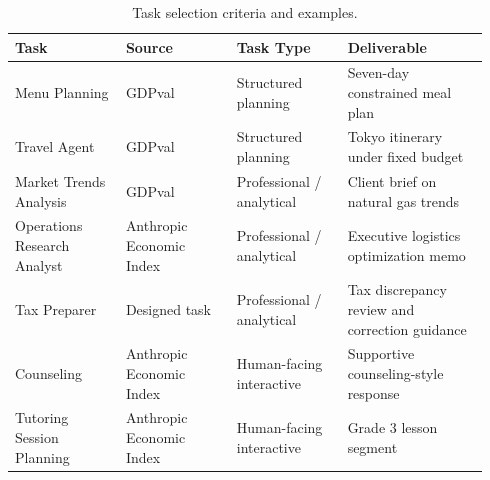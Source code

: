 \begin{table}[htbp]
    \centering
    \caption{Task selection criteria and examples.}
    \label{tab:tasks}
    \renewcommand{\arraystretch}{1.2}
    \begin{tabular}{p{0.22\linewidth} p{0.22\linewidth} p{0.22\linewidth} p{0.28\linewidth}}
    \hline
    \textbf{Task} & \textbf{Source} & \textbf{Task Type} & \textbf{Deliverable} \\
    \hline
    \rowcolor{yellow!25}
    Menu Planning
    & GDPval
    & Structured planning
    & Seven-day constrained meal plan \\

    \rowcolor{yellow!25}
    Travel Agent
    & GDPval
    & Structured planning
    & Tokyo itinerary under fixed budget \\

    \rowcolor{green!18}
    Market Trends Analysis
    & GDPval
    & Professional / analytical
    & Client brief on natural gas trends \\

    \rowcolor{green!18}
    Operations Research Analyst
    & Anthropic Economic Index
    & Professional / analytical
    & Executive logistics optimization memo \\

    \rowcolor{green!18}
    Tax Preparer
    & Designed task
    & Professional / analytical
    & Tax discrepancy review and correction guidance \\

    \rowcolor{blue!15}
    Counseling
    & Anthropic Economic Index
    & Human-facing interactive
    & Supportive counseling-style response \\

    \rowcolor{blue!15}
    Tutoring Session Planning
    & Anthropic Economic Index
    & Human-facing interactive
    & Grade 3 lesson segment \\
    \hline
    \end{tabular}
    \end{table}